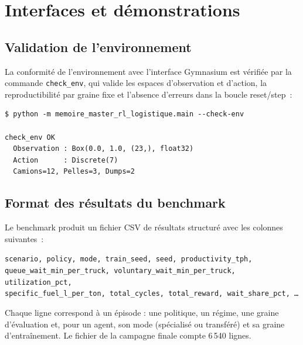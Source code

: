 \documentclass[11pt,a4paper]{report}
\begin{document}
\chapter{Interfaces et démonstrations}
\label{ann:interfaces}

\section*{Validation de l'environnement}

La conformité de l'environnement avec l'interface Gymnasium est vérifiée par la commande \texttt{check\_env}, qui valide les espaces d'observation et d'action, la reproductibilité par graine fixe et l'absence d'erreurs dans la boucle reset/step~:

\begin{lstlisting}
$ python -m memoire_master_rl_logistique.main --check-env

check_env OK
  Observation : Box(0.0, 1.0, (23,), float32)
  Action      : Discrete(7)
  Camions=12, Pelles=3, Dumps=2
\end{lstlisting}

\section*{Format des résultats du benchmark}

Le benchmark produit un fichier CSV de résultats structuré avec les colonnes suivantes~:

\begin{center}
\texttt{scenario, policy, mode, train\_seed, seed, productivity\_tph,}\\
\texttt{queue\_wait\_min\_per\_truck, voluntary\_wait\_min\_per\_truck, utilization\_pct,}\\
\texttt{specific\_fuel\_l\_per\_ton, total\_cycles, total\_reward, wait\_share\_pct, \ldots}
\end{center}

Chaque ligne correspond à un épisode : une politique, un régime, une graine d'évaluation et, pour un agent, son mode (spécialisé ou transféré) et sa graine d'entraînement. Le fichier de la campagne finale compte 6\,540 lignes.

\end{document}
